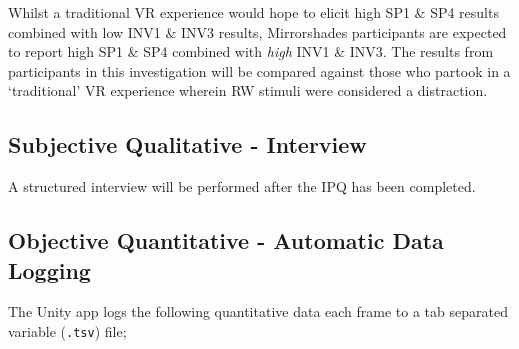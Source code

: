 \documentclass[oneside]{book}
\begin{document}

Whilst a traditional VR experience would hope to elicit high SP1 \& SP4 results combined with low INV1 \& INV3 results, Mirrorshades participants are expected to report high SP1 \& SP4 combined with \textit{high} INV1 \& INV3. The results from participants in this investigation will be compared against those who partook in a `traditional' VR experience wherein RW stimuli were considered a distraction.


\subsection{Subjective Qualitative - Interview}
A structured interview will be performed after the IPQ has been completed.

\subsection{Objective Quantitative - Automatic Data Logging}
The Unity app logs the following quantitative data each frame to a tab separated variable (\texttt{.tsv}) file;
\end{document}
